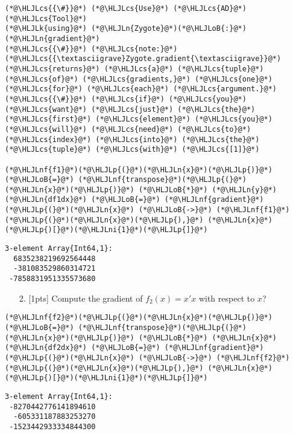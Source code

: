 \documentclass[12pt,a4paper]{article}
\newcommand{\HLJLk}[1]{\textcolor[RGB]{148,91,176}{\textbf{#1}}}
\newcommand{\HLJLn}[1]{#1}
\newcommand{\HLJLnf}[1]{\textcolor[RGB]{66,102,213}{#1}}
\newcommand{\HLJLni}[1]{\textcolor[RGB]{59,151,46}{#1}}
\newcommand{\HLJLoB}[1]{\textcolor[RGB]{102,102,102}{\textbf{#1}}}
\newcommand{\HLJLp}[1]{#1}
\newcommand{\HLJLcs}[1]{\textcolor[RGB]{153,153,119}{\textit{#1}}}
\begin{document}
\begin{lstlisting}
(*@\HLJLcs{{\#}}@*) (*@\HLJLcs{Use}@*) (*@\HLJLcs{AD}@*) (*@\HLJLcs{Tool}@*)
(*@\HLJLk{using}@*) (*@\HLJLn{Zygote}@*)(*@\HLJLoB{:}@*) (*@\HLJLn{gradient}@*)
(*@\HLJLcs{{\#}}@*) (*@\HLJLcs{note:}@*) (*@\HLJLcs{{\textasciigrave}Zygote.gradient{\textasciigrave}}@*) (*@\HLJLcs{returns}@*) (*@\HLJLcs{a}@*) (*@\HLJLcs{tuple}@*) (*@\HLJLcs{of}@*) (*@\HLJLcs{gradients,}@*) (*@\HLJLcs{one}@*) (*@\HLJLcs{for}@*) (*@\HLJLcs{each}@*) (*@\HLJLcs{argument.}@*)
(*@\HLJLcs{{\#}}@*) (*@\HLJLcs{if}@*) (*@\HLJLcs{you}@*) (*@\HLJLcs{want}@*) (*@\HLJLcs{just}@*) (*@\HLJLcs{the}@*) (*@\HLJLcs{first}@*) (*@\HLJLcs{element}@*) (*@\HLJLcs{you}@*) (*@\HLJLcs{will}@*) (*@\HLJLcs{need}@*) (*@\HLJLcs{to}@*) (*@\HLJLcs{index}@*) (*@\HLJLcs{into}@*) (*@\HLJLcs{the}@*) (*@\HLJLcs{tuple}@*) (*@\HLJLcs{with}@*) (*@\HLJLcs{[1]}@*)

(*@\HLJLnf{f1}@*)(*@\HLJLp{(}@*)(*@\HLJLn{x}@*)(*@\HLJLp{)}@*) (*@\HLJLoB{=}@*) (*@\HLJLnf{transpose}@*)(*@\HLJLp{(}@*)(*@\HLJLn{x}@*)(*@\HLJLp{)}@*) (*@\HLJLoB{*}@*) (*@\HLJLn{y}@*)
(*@\HLJLn{df1dx}@*) (*@\HLJLoB{=}@*) (*@\HLJLnf{gradient}@*)(*@\HLJLp{(}@*)(*@\HLJLn{x}@*) (*@\HLJLoB{->}@*) (*@\HLJLnf{f1}@*)(*@\HLJLp{(}@*)(*@\HLJLn{x}@*)(*@\HLJLp{),}@*) (*@\HLJLn{x}@*)(*@\HLJLp{)[}@*)(*@\HLJLni{1}@*)(*@\HLJLp{]}@*)
\end{lstlisting}

\begin{lstlisting}
3-element Array{Int64,1}:
  6835238219692564448
  -381083529860314721
 -7858831951335573680
\end{lstlisting}


\begin{itemize}
\item[2. ] [1pts] Compute the gradient of $f_2(x) = x'x$ with respect to $x$?

\end{itemize}

\begin{lstlisting}
(*@\HLJLnf{f2}@*)(*@\HLJLp{(}@*)(*@\HLJLn{x}@*)(*@\HLJLp{)}@*) (*@\HLJLoB{=}@*) (*@\HLJLnf{transpose}@*)(*@\HLJLp{(}@*)(*@\HLJLn{x}@*)(*@\HLJLp{)}@*) (*@\HLJLoB{*}@*) (*@\HLJLn{x}@*)
(*@\HLJLn{df2dx}@*) (*@\HLJLoB{=}@*) (*@\HLJLnf{gradient}@*)(*@\HLJLp{(}@*)(*@\HLJLn{x}@*) (*@\HLJLoB{->}@*) (*@\HLJLnf{f2}@*)(*@\HLJLp{(}@*)(*@\HLJLn{x}@*)(*@\HLJLp{),}@*) (*@\HLJLn{x}@*)(*@\HLJLp{)[}@*)(*@\HLJLni{1}@*)(*@\HLJLp{]}@*)
\end{lstlisting}

\begin{lstlisting}
3-element Array{Int64,1}:
 -8270442776141894610
  -605331187883253270
 -1523442933334844300
\end{lstlisting}
\end{document}
